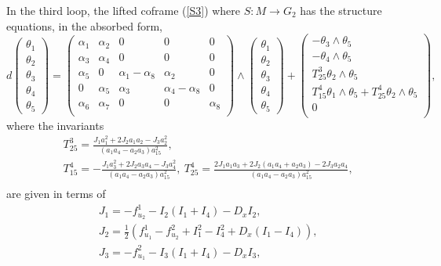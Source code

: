 \documentclass[12pt]{article}
\begin{document}
In the third loop, the lifted coframe (\ref{S3}) where $S:M\rightarrow G_2$ has the structure equations, in the absorbed form,
\begin{equation}
d\begin{pmatrix}
\theta_1\\
\theta_2\\
\theta_3\\
\theta_4\\
\theta_5
\end{pmatrix}
=\begin{pmatrix}
\alpha_1&\alpha_2&0&0&0\\
\alpha_3&\alpha_4&0&0&0\\
\alpha_5&0&\alpha_1-\alpha_{8}&\alpha_2&0\\
0&\alpha_{5}&\alpha_{3}&\alpha_{4}-\alpha_{8}&0\\
\alpha_{6}&\alpha_{7}&0&0&\alpha_{8}\\
\end{pmatrix}\wedge
\begin{pmatrix}
\theta_1\\
\theta_2\\
\theta_3\\
\theta_4\\
\theta_5
\end{pmatrix}+\begin{pmatrix}
-\theta_3\wedge\theta_5\\
-\theta_4\wedge\theta_5\\
T^3_{25}\theta_2\wedge\theta_5\\
T^4_{15}\theta_1\wedge\theta_5+T^4_{25}\theta_2\wedge\theta_5\\
0\\
\end{pmatrix},
\end{equation}
where the invariants
\begin{equation}
\begin{aligned}
&T^3_{25}=\frac{J_1a^2_1+2J_2a_1a_2-J_3a^2_2}{(a_1a_4-a_2a_3)a^2_{15}},\\
& T^4_{15}=-\frac{J_1a^2_3+2J_2a_3a_4-J_3a^2_4}{(a_1a_4-a_2a_3)a^2_{15}}, ~T^4_{25}=\frac{2J_1a_1a_3+2J_2(a_1a_4+a_2a_3)-2J_3a_2a_4}{(a_1a_4-a_2a_3)a^2_{15}},\\
\end{aligned}
\end{equation}
are given in terms of
\begin{equation}\label{E40}
\begin{aligned}
&J_1=-f^1_{u_2}-I_2(I_1+I_4)-D_xI_2,\\
&J_2=\frac{1}{2}(f^1_{u_1}-f^2_{u_2}+I_1^2-I_4^2+D_x(I_1-I_4)),\\
&J_3=-f^2_{u_1}-I_3(I_1+I_4)-D_xI_3,\\
\end{aligned}
\end{equation}
\end{document}
